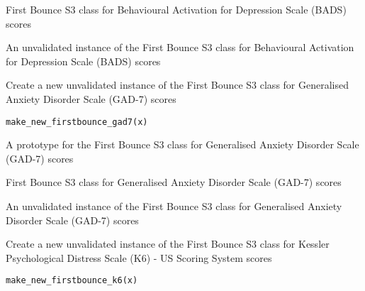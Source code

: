 \documentclass[a4paper]{book}
\begin{document}
%
\begin{Details}\relax
First Bounce S3 class for Behavioural Activation for Depression Scale (BADS) scores
\end{Details}
%
\begin{Value}
An unvalidated instance of the First Bounce S3 class for Behavioural Activation for Depression Scale (BADS) scores
\end{Value}
%
\begin{Description}\relax
Create a new unvalidated instance of the First Bounce S3 class for Generalised Anxiety Disorder Scale (GAD-7) scores
\end{Description}
%
\begin{Usage}
\begin{verbatim}
make_new_firstbounce_gad7(x)
\end{verbatim}
\end{Usage}
%
\begin{Arguments}
\begin{ldescription}
\item[\code{x}] A prototype for the First Bounce S3 class for Generalised Anxiety Disorder Scale (GAD-7) scores
\end{ldescription}
\end{Arguments}
%
\begin{Details}\relax
First Bounce S3 class for Generalised Anxiety Disorder Scale (GAD-7) scores
\end{Details}
%
\begin{Value}
An unvalidated instance of the First Bounce S3 class for Generalised Anxiety Disorder Scale (GAD-7) scores
\end{Value}
%
\begin{Description}\relax
Create a new unvalidated instance of the First Bounce S3 class for Kessler Psychological Distress Scale (K6) - US Scoring System scores
\end{Description}
%
\begin{Usage}
\begin{verbatim}
make_new_firstbounce_k6(x)
\end{verbatim}
\end{Usage}
\end{document}

